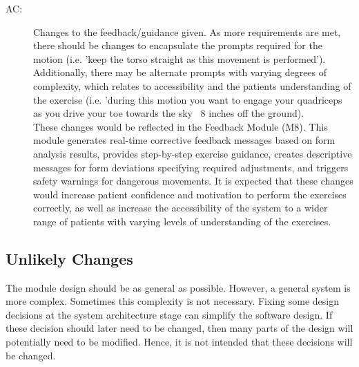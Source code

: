 \documentclass[12pt, titlepage]{article}
\newcounter{acnum}
\newcommand{\actheacnum}{AC\theacnum}
\begin{document}
\begin{description}
\item[ \actheacnum \label{AC3}:]
Changes to the feedback/guidance given. As more requirements are met, there should be changes to encapsulate the prompts required for the motion (i.e. 'keep the torso straight as this movement is performed'). Additionally, there may be alternate prompts with varying degrees of complexity, which relates to accessibility and the patients understanding of the exercise (i.e. 'during this motion you want to engage your quadriceps as you drive your toe towards the sky ~8 inches off the ground). \\
These changes would be reflected in the Feedback Module (M8). This module generates real-time corrective feedback messages based on form analysis results, provides step-by-step exercise guidance, creates descriptive messages for form deviations specifying required adjustments, and triggers safety warnings for dangerous movements. It is expected that these changes would increase patient confidence and motivation to perform the exercises correctly, as well as increase the accessibility of the system to a wider range of patients with varying levels of understanding of the exercises.
\end{description}



\subsection{Unlikely Changes} \label{SecUchange}

The module design should be as general as possible. However, a general system is
more complex. Sometimes this complexity is not necessary. Fixing some design
decisions at the system architecture stage can simplify the software design. If
these decision should later need to be changed, then many parts of the design
will potentially need to be modified. Hence, it is not intended that these
decisions will be changed.
\end{document}
